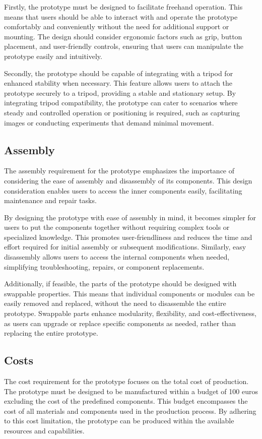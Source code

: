 Firstly, the prototype must be designed to facilitate freehand operation. This means that users should be able to interact with and operate the prototype comfortably and conveniently without the need for additional support or mounting. The design should consider ergonomic factors such as grip, button placement, and user-friendly controls, ensuring that users can manipulate the prototype easily and intuitively.

Secondly, the prototype should be capable of integrating with a tripod for enhanced stability when necessary. This feature allows users to attach the prototype securely to a tripod, providing a stable and stationary setup. By integrating tripod compatibility, the prototype can cater to scenarios where steady and controlled operation or positioning is required, such as capturing images or conducting experiments that demand minimal movement.

\subsection{Assembly}
The assembly requirement for the prototype emphasizes the importance of considering the ease of assembly and disassembly of its components. This design consideration enables users to access the inner components easily, facilitating maintenance and repair tasks.

By designing the prototype with ease of assembly in mind, it becomes simpler for users to put the components together without requiring complex tools or specialized knowledge. This promotes user-friendliness and reduces the time and effort required for initial assembly or subsequent modifications. Similarly, easy disassembly allows users to access the internal components when needed, simplifying troubleshooting, repairs, or component replacements.

Additionally, if feasible, the parts of the prototype should be designed with swappable properties. This means that individual components or modules can be easily removed and replaced, without the need to disassemble the entire prototype. Swappable parts enhance modularity, flexibility, and cost-effectiveness, as users can upgrade or replace specific components as needed, rather than replacing the entire prototype.

\subsection{Costs}
The cost requirement for the prototype focuses on the total cost of production. The prototype must be designed to be manufactured within a budget of 100 euros excluding the cost of the predefined components. This budget encompasses the cost of all materials and components used in the production process. By adhering to this cost limitation, the prototype can be produced within the available resources and capabilities.

